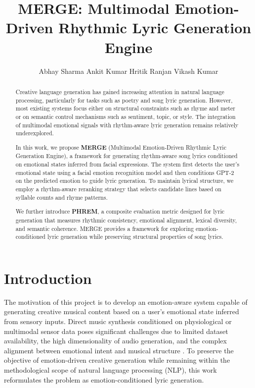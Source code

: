 \documentclass[11pt]{article}
\title{MERGE: Multimodal Emotion-Driven Rhythmic Lyric Generation Engine}
\author{Abhay Sharma \And Ankit Kumar \And Hritik Ranjan \And Vikash Kumar}
\begin{document}
\maketitle


\begin{abstract}
Creative language generation has gained increasing attention in natural language 
processing, particularly for tasks such as poetry and song lyric generation. 
However, most existing systems focus either on structural constraints such as 
rhyme and meter or on semantic control mechanisms such as sentiment, topic, 
or style. The integration of multimodal emotional signals with rhythm-aware 
lyric generation remains relatively underexplored.

In this work, we propose \textbf{MERGE} (Multimodal Emotion-Driven Rhythmic 
Lyric Generation Engine), a framework for generating rhythm-aware song lyrics 
conditioned on emotional states inferred from facial expressions. The system 
first detects the user’s emotional state using a facial emotion recognition 
model and then conditions GPT-2 on the predicted 
emotion to guide lyric generation. To maintain lyrical structure, we employ 
a rhythm-aware reranking strategy that selects candidate lines based on 
syllable counts and rhyme patterns.

We further introduce \textbf{PHREM}, a composite evaluation metric designed 
for lyric generation that measures rhythmic consistency, emotional alignment, 
lexical diversity, and semantic coherence. MERGE provides a framework for 
exploring emotion-conditioned lyric generation while preserving structural 
properties of song lyrics.\end{abstract}




\section{Introduction}

The motivation of this project is to develop an emotion-aware system 
capable of generating creative musical content based on a user's 
emotional state inferred from sensory inputs. Direct music synthesis 
conditioned on physiological or multimodal sensor data poses significant 
challenges due to limited dataset availability, the high dimensionality 
of audio generation, and the complex alignment between emotional intent 
and musical structure \cite{cao2022multi}. To preserve the objective of 
emotion-driven creative generation while remaining within the methodological 
scope of natural language processing (NLP), this work reformulates the 
problem as emotion-conditioned lyric generation.
\end{document}
